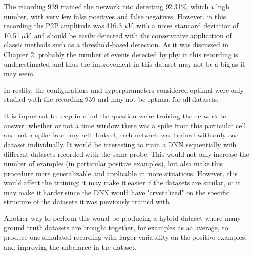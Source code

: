 The recording 939 trained the network into detecting 92.31\%, which a high number, with very few false positives and false negatives. However, in this recording the P2P amplitude was 416.3 $\mu V$, with a noise standard deviation of 10.51 $\mu V$, and should be easily detected with the conservative application of classic methods such as a threshold-based detection.
As it was discussed in Chapter 2, probably the number of events detected by phy in this recording is underestimated and thus the improvement in this dataset may not be a big as it may seem.

In reality, the configurations and hyperparameters considered optimal were only studied with the recording 939 and may not be optimal for all datasets.




It is important to keep in mind the question we're training the network to answer: whether or not a time window there was a spike from this particular cell, and not a spike from any cell. Indeed, each network was trained with only one dataset individually. It would be interesting to train a DNN sequentially with different datasets recorded with the same probe. This would not only increase the number of examples (in particular positive examples), but also make this procedure more generalizable and applicable in more situations. However, this would affect the training: it may make it easier if the datasets are similar, or it may make it harder since the DNN would have "crystalized" on the specific structure of the datasets  it was previously trained with. 

Another way to perform this would be producing a hybrid dataset where many ground truth datasets are brought together, for examples as an average, to produce one simulated recording with larger variability on the positive examples, and improving the unbalance in the dataset.

